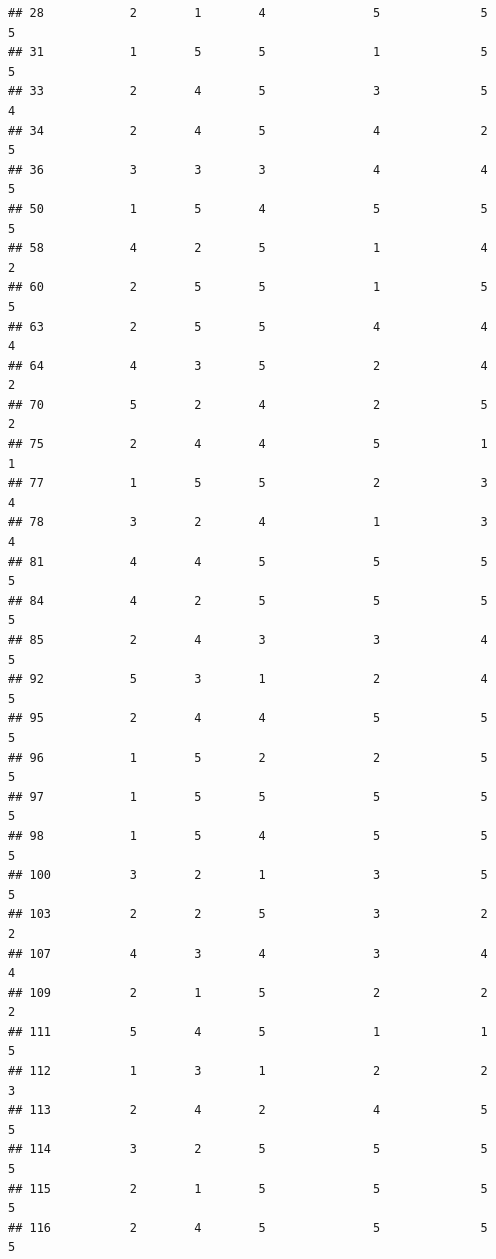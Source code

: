 \documentclass[
]{article}
\begin{document}
\begin{verbatim}
## 28            2        1        4               5              5             5
## 31            1        5        5               1              5             5
## 33            2        4        5               3              5             4
## 34            2        4        5               4              2             5
## 36            3        3        3               4              4             5
## 50            1        5        4               5              5             5
## 58            4        2        5               1              4             2
## 60            2        5        5               1              5             5
## 63            2        5        5               4              4             4
## 64            4        3        5               2              4             2
## 70            5        2        4               2              5             2
## 75            2        4        4               5              1             1
## 77            1        5        5               2              3             4
## 78            3        2        4               1              3             4
## 81            4        4        5               5              5             5
## 84            4        2        5               5              5             5
## 85            2        4        3               3              4             5
## 92            5        3        1               2              4             5
## 95            2        4        4               5              5             5
## 96            1        5        2               2              5             5
## 97            1        5        5               5              5             5
## 98            1        5        4               5              5             5
## 100           3        2        1               3              5             5
## 103           2        2        5               3              2             2
## 107           4        3        4               3              4             4
## 109           2        1        5               2              2             2
## 111           5        4        5               1              1             5
## 112           1        3        1               2              2             3
## 113           2        4        2               4              5             5
## 114           3        2        5               5              5             5
## 115           2        1        5               5              5             5
## 116           2        4        5               5              5             5

\end{verbatim}
\end{document}
